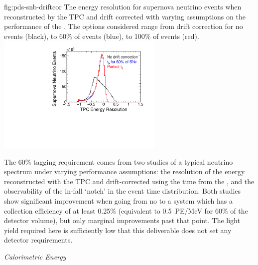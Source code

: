 \begin{dunefigure}
{fig:pds-snb-driftcor}
{The energy resolution for supernova neutrino events when reconstructed by the TPC and drift corrected with varying assumptions on the performance of the . The options considered range from drift correction for no events (black), to 60\% of events (blue), to 100\% of events (red).
}
  \includegraphics[width=0.6\textwidth]{graphics/pds-snb-drift-corr}
 \end{dunefigure}

The 60\% \tzero tagging requirement comes from two studies of a typical  neutrino spectrum under varying  performance assumptions: the resolution of the energy reconstructed with the TPC and drift-corrected using the time from the , and the observability of the in-fall `notch' in the  event time distribution. Both studies show significant improvement when going from no  to a system which has a collection efficiency of at least 0.25\% (equivalent to \SI{0.5}{PE/MeV} for 60\% of the detector volume), but only marginal improvements past that point. The light yield required here is sufficiently low that this deliverable does not set any detector requirements.


\textit{Calorimetric Energy}\nopagebreak


